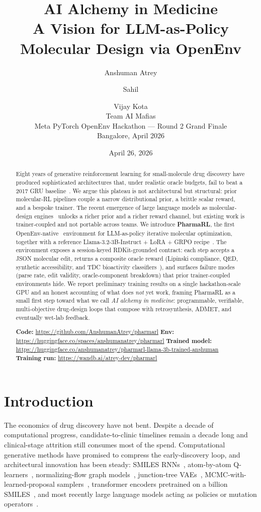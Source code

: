 \documentclass[11pt,a4paper]{article}
\title{\textbf{AI Alchemy in Medicine} \\[0.3em]
{\large A Vision for LLM-as-Policy Molecular Design via OpenEnv}}
\author{
  Anshuman Atrey \and Sahil \and Vijay Kota \\[0.4em]
  \normalsize Team AI Mafias \\
  \normalsize Meta PyTorch OpenEnv Hackathon --- Round 2 Grand Finale \\
  \normalsize Bangalore, April 2026
}
\date{April 26, 2026}
\newcommand{\wandbRunURL}{https://wandb.ai/atrey-dev/pharmarl}
\newcommand{\modelHFURL}{https://huggingface.co/anshumanatrey/pharmarl-llama-3b-trained-anshuman}
\newcommand{\envHFURL}{https://huggingface.co/spaces/anshumanatrey/pharmarl}
\newcommand{\codeURL}{https://github.com/AnshumanAtrey/pharmarl}
\begin{document}
\maketitle

\begin{abstract}
\noindent
Eight years of generative reinforcement learning for small-molecule drug discovery have produced sophisticated architectures that, under realistic oracle budgets, fail to beat a 2017 GRU baseline~\cite{gao2022pmo,olivecrona2017reinvent}. We argue this plateau is not architectural but structural: prior molecular-RL pipelines couple a narrow distributional prior, a brittle scalar reward, and a bespoke trainer. The recent emergence of large language models as molecular-design engines~\cite{anstine2024llmmoldesign,cavanagh2024smileyllama} unlocks a richer prior and a richer reward channel, but existing work is trainer-coupled and not portable across teams. We introduce \textbf{PharmaRL}, the first OpenEnv-native~\cite{metaopenenv2025} environment for LLM-as-policy iterative molecular optimization, together with a reference Llama-3.2-3B-Instruct + LoRA + GRPO recipe~\cite{shao2024deepseekmath,hu2022lora,metallama32}. The environment exposes a session-keyed RDKit-grounded contract: each step accepts a JSON molecular edit, returns a composite oracle reward (Lipinski compliance, QED, synthetic accessibility, and TDC bioactivity classifiers~\cite{huang2021tdc,bickerton2012qed,ertl2009sa}), and surfaces failure modes (parse rate, edit validity, oracle-component breakdown) that prior trainer-coupled environments hide. We report preliminary training results on a single hackathon-scale GPU and an honest accounting of what does \emph{not} yet work, framing PharmaRL as a small first step toward what we call \emph{AI alchemy in medicine}: programmable, verifiable, multi-objective drug-design loops that compose with retrosynthesis, ADMET, and eventually wet-lab feedback.

\smallskip
\noindent\textbf{Code:} \url{\codeURL} \quad \textbf{Env:} \url{\envHFURL} \quad \textbf{Trained model:} \url{\modelHFURL} \quad \textbf{Training run:} \url{\wandbRunURL}
\end{abstract}

\section{Introduction}

The economics of drug discovery have not bent. Despite a decade of computational progress, candidate-to-clinic timelines remain a decade long and clinical-stage attrition still consumes most of the spend. Computational generative methods have promised to compress the early-discovery loop, and architectural innovation has been steady: SMILES RNNs~\cite{olivecrona2017reinvent,blaschke2020reinvent2,loeffler2024reinvent4}, atom-by-atom Q-learners~\cite{zhou2019moldqn}, normalizing-flow graph models~\cite{shi2020graphaf}, junction-tree VAEs~\cite{jin2018jtvae}, MCMC-with-learned-proposal samplers~\cite{xie2021mars}, transformer encoders pretrained on a billion SMILES~\cite{ross2022molformer}, and most recently large language models acting as policies or mutation operators~\cite{anstine2024llmmoldesign,wang2025molleo,guevorguian2024smallmolllm}.
\end{document}
